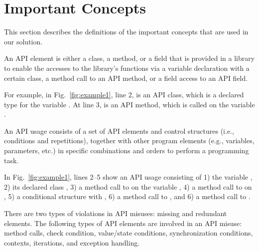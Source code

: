 \section{Important Concepts}
\label{sec:concepts}

This section describes the definitions of the important concepts
that are used in our solution.


\begin{Definition}
An API element is either a class, a method, or a field that is
provided in a library to enable the accesses to the library's
functions via a variable declaration with a certain class, a method
call to an API method, or a field access to an API field.
\end{Definition}

For example, in Fig.~\ref{fig:example1}, line 2,  is
an API class, which is a declared type for the variable
. At line 3,  is an API
method, which is called on the variable .

\begin{Definition}
An API usage consists of a set of API elements and control structures
(i.e., conditions and repetitions), together with other program
elements (e.g., variables, parameters, etc.) in specific combinations
and orders to perform a programming task.
\end{Definition}

In Fig.~\ref{fig:example1}, lines 2--5 show an API usage consisting of
1) the variable , 2) its declared class
, 3) a method call to  on the
variable , 4) a method call to  on
, 5) a conditional structure with
, 6) a method call to , and 6) a method
call to .

\begin{Definition}
There are two types of violations in API misuses: missing and
redundant elements. The following types of API elements are
involved in an API misuse: method calls,  check condition,
value/state conditions, synchronization conditions, contexts,
iterations, and exception handling.
\end{Definition}

